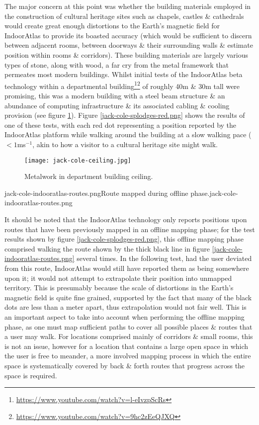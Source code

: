 The major concern at this point was whether the building materials employed in the construction of cultural heritage sites such as chapels, castles \& cathedrals would create great enough distortions to the Earth's magnetic field for IndoorAtlas to provide its boasted accuracy (which would be sufficient to discern between adjacent rooms, between doorways \& their surrounding walls \& estimate position within rooms \& corridors). These building materials are largely various types of stone, along with wood, a far cry from the metal framework that permeates most modern buildings. Whilst initial tests of the IndoorAtlas beta technology within a departmental building\footnote{\url{https://www.youtube.com/watch?v=l-eIvzpScRs}}\footnote{\url{https://www.youtube.com/watch?v=9hc2zEeQJXQ}} of roughly 40m \& 30m tall were promising, this was a modern building with a steel beam structure \& an abundance of computing infrastructure \& its associated cabling \& cooling provision (see figure \ref{jack-cole-ceiling.jpg}). Figure \ref{jack-cole-splodges-red.png} shows the results of one of these tests, with each red dot representing a position reported by the IndoorAtlas platform while walking around the building at a slow walking pace ($<1$ms$^{-1}$, akin to how a visitor to a cultural heritage site might walk.

\begin{figure}[h]
	\begin{center}
		\texttt{[image: jack-cole-ceiling.jpg]}
		\caption{Metalwork in department building ceiling.}
		\label{jack-cole-ceiling.jpg}
	\end{center}
\end{figure}

       {jack-cole-indooratlas-routes.png}{Route mapped during offline phase.}{jack-cole-indooratlas-routes.png}

It should be noted that the IndoorAtlas technology only reports positions upon routes that have been previously mapped in an offline mapping phase; for the test results shown by figure \ref{jack-cole-splodges-red.png}, this offline mapping phase comprised walking the route shown by the thick black line in figure \ref{jack-cole-indooratlas-routes.png} several times. In the following test, had the user deviated from this route, IndoorAtlas would still have reported them as being somewhere upon it; it would not attempt to extrapolate their position into unmapped territory. This is presumably because the scale of distortions in the Earth's magnetic field is quite fine grained, supported by the fact that many of the black dots are less than a meter apart, thus extrapolation would not fair well. This is an important aspect to take into account when performing the offline mapping phase, as one must map sufficient paths to cover all possible places \& routes that a user may walk. For locations comprised mainly of corridors \& small rooms, this is not an issue, however for a location that contains a large open space in which the user is free to meander, a more involved mapping process in which the entire space is systematically covered by back \& forth routes that progress across the space is required.

